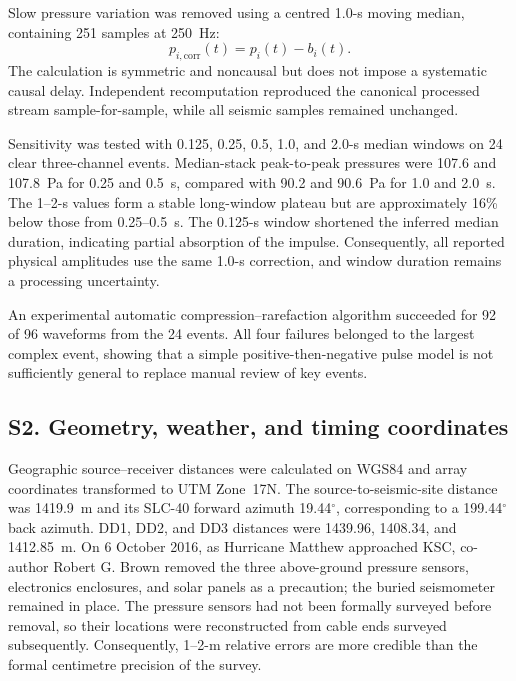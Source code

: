 \documentclass[]{seismica}
\begin{document}
Slow pressure variation was removed using a centred 1.0-s moving median,
containing 251 samples at 250~Hz:
\begin{equation}
 p_{i,\mathrm{corr}}(t)=p_i(t)-b_i(t).
\end{equation}
The calculation is symmetric and noncausal but does not impose a systematic
causal delay. Independent recomputation reproduced the canonical processed
stream sample-for-sample, while all seismic samples remained unchanged.

Sensitivity was tested with 0.125, 0.25, 0.5, 1.0, and 2.0-s median windows on
24 clear three-channel events. Median-stack peak-to-peak pressures were 107.6
and 107.8~Pa for 0.25 and 0.5~s, compared with 90.2 and 90.6~Pa for 1.0 and
2.0~s. The 1--2-s values form a stable long-window plateau but are
approximately 16\% below those from 0.25--0.5~s. The 0.125-s window shortened
the inferred median duration, indicating partial absorption of the impulse.
Consequently, all reported physical amplitudes use the same 1.0-s correction,
and window duration remains a processing uncertainty.

An experimental automatic compression--rarefaction algorithm succeeded for
92 of 96 waveforms from the 24 events. All four failures belonged to the
largest complex event, showing that a simple positive-then-negative pulse model
is not sufficiently general to replace manual review of key events.

\FloatBarrier
\subsection{S2. Geometry, weather, and timing coordinates}
\label{sec:supp_weather}

Geographic source--receiver distances were calculated on WGS84 and array
coordinates transformed to UTM Zone~17N. The source-to-seismic-site distance
was 1419.9~m and its SLC-40 forward azimuth 19.44$^\circ$, corresponding to a
199.44$^\circ$ back azimuth. DD1, DD2, and DD3 distances were 1439.96,
1408.34, and 1412.85~m. On 6 October 2016, as Hurricane Matthew approached
KSC, co-author Robert G. Brown removed the three above-ground pressure sensors,
electronics enclosures, and solar panels as a precaution; the buried
seismometer remained in place. The pressure sensors had not been formally
surveyed before removal, so their locations were reconstructed from cable ends
surveyed subsequently. Consequently, 1--2-m relative errors are more credible
than the formal centimetre precision of the survey.
\end{document}
